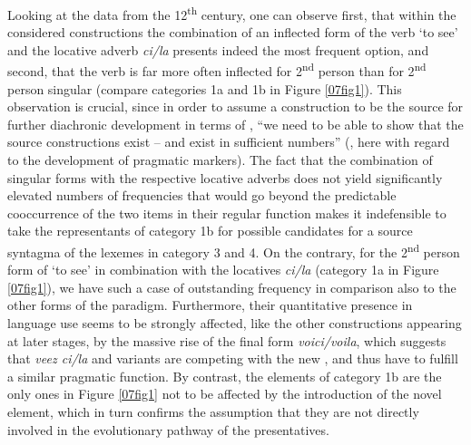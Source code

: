 \documentclass[output=paper,colorlinks,citecolor=brown]{langscibook}
\begin{document}
Looking at the data from the 12\textsuperscript{th} century, one can observe first, that within the considered constructions the combination of an inflected form of the verb `to see' and the locative adverb \emph{ci/la} presents indeed the most frequent option, and second, that the verb is far more often inflected for 2\textsuperscript{nd} person  than for 2\textsuperscript{nd} person singular (compare categories 1a and 1b in Figure \ref{07fig1}). This observation is crucial, since in order to assume a construction to be the source for further diachronic development in terms of , ``we need to be able to show that the source constructions exist -- and exist in sufficient numbers'' (\citealt[284]{brinton2017}, here with regard to the development of pragmatic markers). The fact that the combination of singular forms with the respective locative adverbs does not yield significantly elevated numbers of frequencies that would go beyond the predictable cooccurrence of the two items in their regular function makes it indefensible to take the representants of category 1b for possible candidates for a source syntagma of the lexemes in category 3 and 4. On the contrary, for the 2\textsuperscript{nd} person  form of `to see' in combination with the locatives \emph{ci/la} (category 1a in Figure \ref{07fig1}), we have such a case of outstanding frequency in comparison also to the other forms of the paradigm. Furthermore, their quantitative presence in language use seems to be strongly affected, like the other  constructions appearing at later stages, by the massive rise of the final  form \emph{voici/voila}, which suggests that \emph{veez ci/la} and variants are competing with the new , and thus have to fulfill a similar pragmatic function. By contrast, the elements of category 1b are the only ones in Figure \ref{07fig1} not to be affected by the introduction of the novel  element, which in turn confirms the assumption that they are not directly involved in the evolutionary pathway of the  presentatives.
\end{document}
